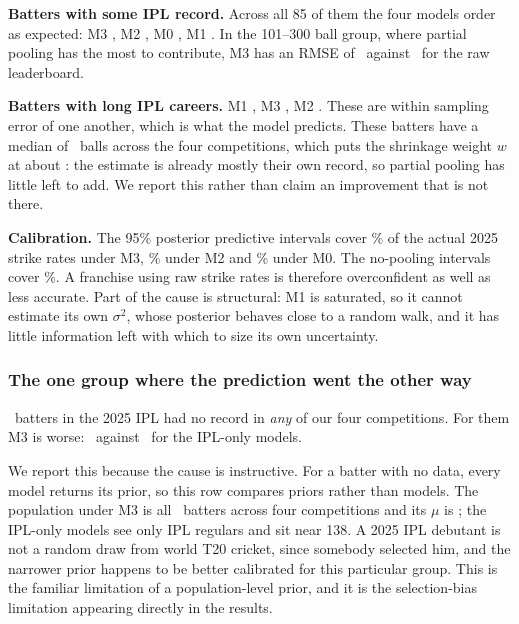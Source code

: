 \documentclass[11pt,a4paper]{article}
\begin{document}
\textbf{Batters with some IPL record.} Across all 85 of them the four models order as
expected: M3 \nrmseRecordMthree, M2 \nrmseRecordMtwo, M0 \nrmseRecordMzero, M1
\nrmseRecordMone. In the 101--300 ball group, where partial pooling has the most to contribute,
M3 has an RMSE of \nrmseMidMthree\ against \nrmseMidMone\ for the raw leaderboard.

\textbf{Batters with long IPL careers.} M1 \nrmseBigMone, M3 \nrmseBigMthree, M2
\nrmseBigMtwo. These are within sampling error of one another, which is what the model
predicts. These batters have a median of \nbigMedianBalls\ balls across the four competitions,
which puts the shrinkage weight $w$ at about \nbigMedianW: the estimate is already mostly their
own record, so partial pooling has little left to add. We report this rather than claim an
improvement that is not there.

\textbf{Calibration.} The 95\% posterior predictive intervals cover \ncovMthree\% of the
actual 2025 strike rates under M3, \ncovMtwo\% under M2 and \ncovMzero\% under M0. The
no-pooling intervals cover \ncovMone\%. A franchise using raw strike rates is therefore overconfident as well as less
accurate. Part of the cause is structural: M1 is saturated, so it cannot estimate its own
$\sigma^2$, whose posterior behaves close to a random walk, and it has little information left
with which to size its own uncertainty.

\subsubsection*{The one group where the prediction went the other way}

\ncountZeroNone\ batters in the 2025 IPL had no record in \emph{any} of our four competitions. For
them M3 is worse: \nrmseZeroNoneMthree\ against \nrmseZeroNoneMzero\ for the IPL-only models.

We report this because the cause is instructive. For a batter with no data, every model
returns its prior, so this row compares priors rather than models. The population under M3 is
all \nNplayers\ batters across four competitions and its $\mu$ is \nmuFit; the IPL-only models
see only IPL regulars and sit near 138. A 2025 IPL debutant is not a random draw from world T20
cricket, since somebody selected him, and the narrower prior happens to be better calibrated for
this particular group. This is the familiar limitation of a population-level prior, and it is
the selection-bias limitation appearing directly in the results.
\end{document}
